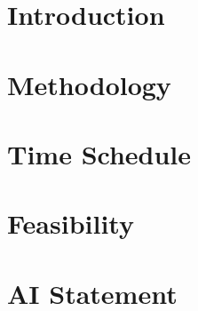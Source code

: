 \documentclass[11pt]{article}
\begin{document}


\newpage
\tableofcontents

\newpage
\section{Introduction}


\section{Methodology}


\section{Time Schedule}


\section{Feasibility}


\section{AI Statement}


\newpage

\end{document}
